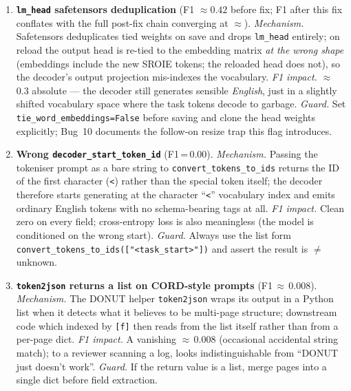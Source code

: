 \begin{enumerate}

\item \textbf{\texttt{lm\_head} safetensors deduplication}
  (F1 $\approx 0.42$ before fix; F1 after this fix conflates with the
  full post-fix chain converging at $\approx$).
  \textit{Mechanism.} Safetensors deduplicates tied weights on save
  and drops \texttt{lm\_head} entirely; on reload the output head
  is re-tied to the embedding matrix \emph{at the wrong shape}
  (embeddings include the new SROIE tokens; the reloaded head does
  not), so the decoder's output projection mis-indexes the vocabulary.
  \textit{F1 impact.} $\approx$\,0.3 absolute --- the decoder still
  generates sensible \emph{English}, just in a slightly shifted
  vocabulary space where the task tokens decode to garbage.
  \textit{Guard.} Set \texttt{tie\_word\_embeddings=False} before
  saving and clone the head weights explicitly; Bug~10 documents
  the follow-on resize trap this flag introduces.

\item \textbf{Wrong \texttt{decoder\_start\_token\_id}} (F1\,=\,0.00).
  \textit{Mechanism.} Passing the tokeniser prompt as a bare string
  to \texttt{convert\_tokens\_to\_ids} returns the ID of the first
  character (\texttt{<}) rather than the special token itself; the
  decoder therefore starts generating at the character ``\texttt{<}''
  vocabulary index and emits ordinary English tokens with no
  schema-bearing tags at all.  \textit{F1 impact.} Clean zero on
  every field; cross-entropy loss is also meaningless (the model is
  conditioned on the wrong start).  \textit{Guard.} Always use the
  list form \texttt{convert\_tokens\_to\_ids(["<task\_start>"])}
  and assert the result is $\neq$ unknown.

\item \textbf{\texttt{token2json} returns a list on CORD-style prompts}
  (F1\,$\approx$\,0.008).
  \textit{Mechanism.} The DONUT helper \texttt{token2json} wraps its
  output in a Python list when it detects what it believes to be
  multi-page structure; downstream code which indexed by \texttt{[f]}
  then reads from the list itself rather than from a per-page dict.
  \textit{F1 impact.} A vanishing $\approx$\,0.008 (occasional
  accidental string match); to a reviewer scanning a log, looks
  indistinguishable from ``DONUT just doesn't work''.
  \textit{Guard.} If the return value is a list, merge pages into a
  single dict before field extraction.


\end{enumerate}
